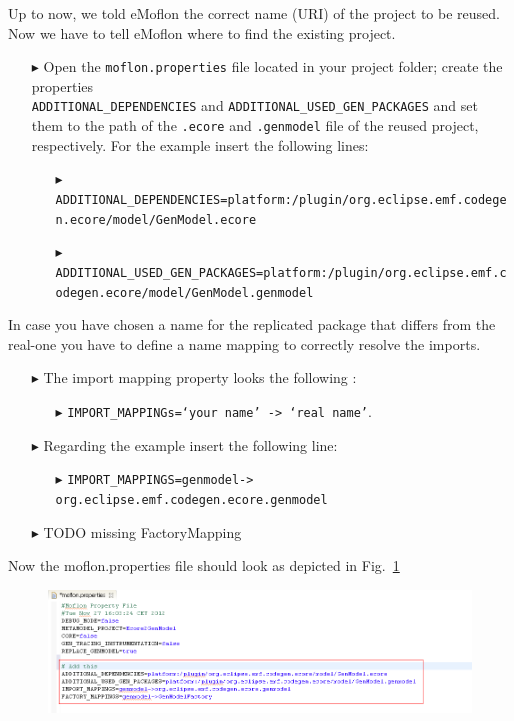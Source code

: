 Up to now, we told eMoflon the correct name (URI) of the project to be reused. Now we have to tell eMoflon where to find the existing project. 
\begin{enumerate}
\item[$\blacktriangleright$]Open the \texttt{moflon.properties} file located in your project folder; create the  properties \\ \texttt{ADDITIONAL\_DEPENDENCIES} and \texttt{ADDITIONAL\_USED\_GEN\_PACKAGES} and  set them to the path of the \texttt{.ecore} and \texttt{.genmodel} file of the reused project, respectively. For the example insert the following lines:
\begin{enumerate}
  \item[$\blacktriangleright$] \texttt{{\tiny ADDITIONAL\_DEPENDENCIES=platform:/plugin/org.eclipse.emf.codegen.ecore/model/GenModel.ecore}}
  \item[$\blacktriangleright$] \texttt{{\tiny ADDITIONAL\_USED\_GEN\_PACKAGES=platform:/plugin/org.eclipse.emf.codegen.ecore/model/GenModel.genmodel}}
\end{enumerate}
\end{enumerate}


In case you have chosen a name for the replicated package that differs from the real-one you have to define a name mapping to correctly resolve the imports.

\begin{enumerate}
	\item[$\blacktriangleright$] The import mapping property looks the following :
	\begin{enumerate}
		\item [$\blacktriangleright$]\texttt{IMPORT\_MAPPINGs=`your name' -> `real name'}. 
	\end{enumerate}
	\item [$\blacktriangleright$]Regarding the example insert the following line:
	\begin{enumerate}
  		\item [$\blacktriangleright$]\texttt{\footnotesize IMPORT\_MAPPINGS=genmodel-> org.eclipse.emf.codegen.ecore.genmodel}
	\end{enumerate}
\end{enumerate}


\begin{enumerate}
		\item [$\blacktriangleright$]TODO missing FactoryMapping
	\end{enumerate}

Now the moflon.properties file should look as depicted in Fig.~\ref{fig_mofProp}

\begin{figure}[htbp]
\begin{center}  \includegraphics[width=1.3\textwidth]{pics/Ecore2GenModel_Bilder/9_mofProperties.png}
  \caption{}  
  \label{fig_mofProp}
\end{center}
\end{figure}  







